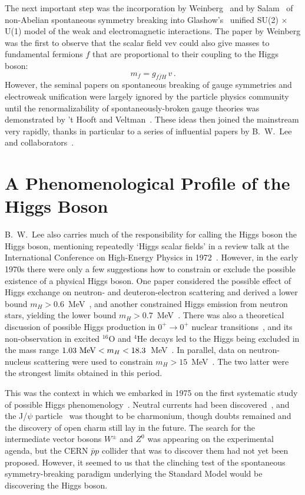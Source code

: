 \documentclass[12pt]{article}
\newcommand{\beq}{\begin{equation}}
\newcommand{\eeq}{\end{equation}}
\numberwithin{equation}{section}
\begin{document}
The next important step was the incorporation by
Weinberg~\cite{Weinberg} and by Salam~\cite{Salam} of non-Abelian
spontaneous symmetry breaking into Glashow's~\cite{Glashow} unified
SU(2) $\times$ U(1) model of the weak and electromagnetic
interactions. The paper by Weinberg was the first to observe that the
scalar field vev could also give masses to fundamental fermions $f$ that
are proportional to their coupling to the Higgs boson:
%
\beq m_f = g_{f\!\bar f H} \, v \, .\label{fmass}\eeq
However, the seminal papers on spontaneous breaking of gauge symmetries and
electroweak unification were largely ignored by the particle physics
community until the renormalizability of spontaneously-broken gauge theories was demonstrated by
't Hooft and Veltman~\cite{tHV}. These ideas then joined the mainstream very rapidly, thanks
in particular to a series of influential papers by B.~W.~Lee and collaborators~\cite{LZJ,FLS}.

\section{A Phenomenological Profile of the Higgs Boson}

B.~W.~Lee also carries much of the responsibility for calling the
Higgs boson the Higgs boson, mentioning repeatedly `Higgs scalar
fields' in a review talk at the International Conference on
High-Energy Physics in 1972~\cite{Lee}. However, in the early 1970s
there were only a few suggestions how to constrain or exclude the
possible existence of a physical Higgs boson. One paper considered the
possible effect of Higgs exchange on neutron- and deuteron-electron
scattering and derived a lower bound $m_H > 0.6$~MeV~\cite{nue}, and
another constrained Higgs emission from neutron stars, yielding the
lower bound $m_H > 0.7$~MeV~\cite{SS}.  There was also a theoretical
discussion of possible Higgs production in $0^+ \to 0^+$ nuclear
transitions~\cite{RSW}, and its non-observation in excited $^{16}$O
and $^4$He decays led to the Higgs being excluded in the mass range
$1.03~{\rm MeV} < m_H < 18.3$~MeV~\cite{KWB}. In parallel, data on
neutron-nucleus scattering were used to constrain $m_H >
15$~MeV~\cite{BE}.  The two latter were the strongest limits obtained
in this period.

This was the context in which we embarked in 1975 on the first systematic study of possible Higgs phenomenology~\cite{EGN}.
Neutral currents had been discovered~\cite{NC}, and the J/$\psi$ particle~\cite{Jpsi} was thought to be charmonium, though
doubts remained and the discovery of open charm still lay in the future. The search for the intermediate vector
bosons $W^\pm$ and $Z^0$ was appearing on the experimental agenda, but the CERN ${\bar p}p$
collider that was to discover them had not yet been proposed. However, it seemed to us that the clinching
test of the spontaneous symmetry-breaking paradigm underlying the Standard Model would be discovering
the Higgs boson.
\end{document}

